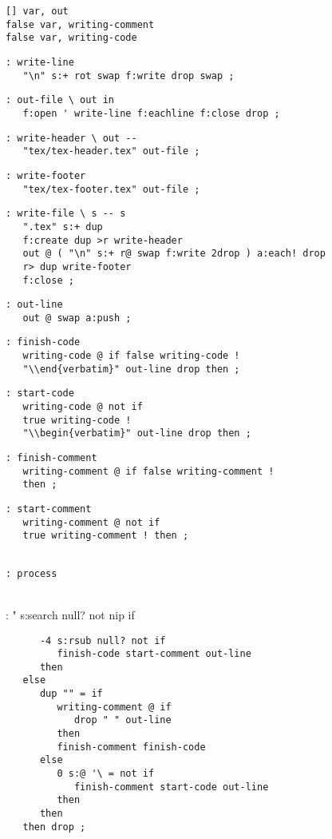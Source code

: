 \documentclass{article}
\begin{document}
 
\begin{verbatim}
[] var, out
false var, writing-comment
false var, writing-code
\end{verbatim}
\begin{verbatim}
: write-line
   "\n" s:+ rot swap f:write drop swap ;
\end{verbatim}
\begin{verbatim}
: out-file \ out in
   f:open ' write-line f:eachline f:close drop ;
\end{verbatim}
\begin{verbatim}
: write-header \ out --
   "tex/tex-header.tex" out-file ;
\end{verbatim}
\begin{verbatim}
: write-footer
   "tex/tex-footer.tex" out-file ;
\end{verbatim}
\begin{verbatim}
: write-file \ s -- s
   ".tex" s:+ dup 
   f:create dup >r write-header
   out @ ( "\n" s:+ r@ swap f:write 2drop ) a:each! drop
   r> dup write-footer
   f:close ;
\end{verbatim}
\begin{verbatim}
: out-line
   out @ swap a:push ;
\end{verbatim}
\begin{verbatim}
: finish-code
   writing-code @ if false writing-code !
   "\\end{verbatim}" out-line drop then ;
\end{verbatim}
\begin{verbatim}
: start-code
   writing-code @ not if
   true writing-code !
   "\\begin{verbatim}" out-line drop then ;
\end{verbatim}
\begin{verbatim}
: finish-comment
   writing-comment @ if false writing-comment !
   then ;
\end{verbatim}
\begin{verbatim}
: start-comment
   writing-comment @ not if
   true writing-comment ! then ;
   
\end{verbatim}
\begin{verbatim}
: process 
\end{verbatim}
\\ : " s:search null? not nip if
\begin{verbatim}
      -4 s:rsub null? not if 
         finish-code start-comment out-line 
      then
   else 
      dup "" = if 
         writing-comment @ if 
            drop " " out-line 
         then  
         finish-comment finish-code 
      else 
         0 s:@ '\ = not if 
            finish-comment start-code out-line 
         then
      then 
   then drop ;
\end{verbatim}
\end{document}
